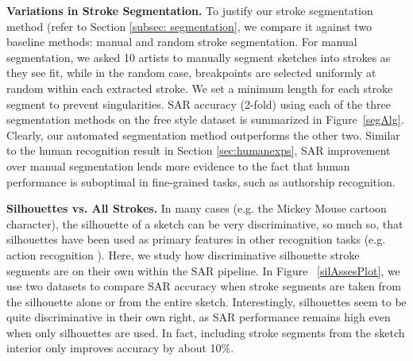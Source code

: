 \noindent\textbf{Variations in Stroke Segmentation.} To justify our stroke segmentation method (refer to Section \ref{subsec: segmentation}, we compare it against two baseline methods: manual and random stroke segmentation.
For manual segmentation, we asked 10 artists to manually segment sketches into strokes as they see fit, while in the random case, breakpoints are selected uniformly at random within each extracted stroke. We set a minimum length for each stroke segment to prevent singularities. SAR accuracy (2-fold) using each of the three segmentation methods on the free style dataset is summarized in Figure~\ref{segAlg}. Clearly, our automated segmentation method outperforms the other two. Similar to the human recognition result in Section \ref{sec:humanexps}, SAR improvement over manual segmentation lends more evidence to the fact that human performance is suboptimal in fine-grained tasks, such as authorship recognition.



\noindent\textbf{Silhouettes vs. All Strokes.} In many cases (e.g. the Mickey Mouse cartoon character), the silhouette of a sketch can be very discriminative, so much so, that silhouettes have been used as primary features in other recognition tasks (e.g. action recognition \cite{li2008expandable}). Here, we study how discriminative silhouette stroke segments are on their own within the SAR pipeline. In Figure ~\ref{silAssesPlot}, we use two datasets to compare SAR accuracy when stroke segments are taken from the silhouette alone or from the entire sketch. Interestingly, silhouettes seem to be quite discriminative in their own right, as SAR performance remains high even when only silhouettes are used. In fact, including stroke segments from the sketch interior only improves accuracy by about 10\%.

